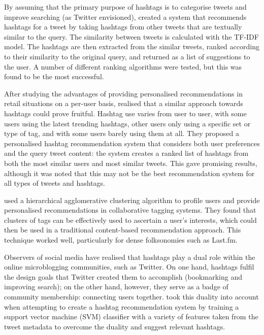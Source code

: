 \documentclass[11pt,a4paper]{report}
\begin{document}
By assuming that the primary purpose of hashtags is to categorise tweets and improve searching (as Twitter envisioned), \textcite{Zangerle:2011} created a system that recommends hashtags for a tweet by taking hashtags from other tweets that are textually similar to the query. The similarity between tweets is calculated with the TF-IDF model. The hashtags are then extracted from the similar tweets, ranked according to their similarity to the original query, and returned as a list of suggestions to the user. A number of different ranking algorithms were tested, but this was found to be the most successful.

After studying the advantages of providing personalised recommendations in retail situations on a per-user basis, \textcite{Kywe:2012} realised that a similar approach towards hashtags could prove fruitful. Hashtag use varies from user to user, with some users using the latest trending hashtags, other users only using a specific set or type of tag, and with some users barely using them at all. They proposed a personalised hashtag recommendation system that considers both user preferences and the query tweet content: the system creates a ranked list of hashtags from both the most similar users and most similar tweets. This gave promising results, although it was noted that this may not be the best recommendation system for all types of tweets and hashtags.

\textcite{Shepitsen:2008} used a hierarchical agglomerative clustering algorithm to profile users and provide personalised recommendations in collaborative tagging systems. They found that clusters of tags can be effectively used to ascertain a user's interests, which could then be used in a traditional content-based recommendation approach. This technique worked well, particularly for dense folksonomies such as Last.fm.

Observers of social media have realised that hashtags play a dual role within the online microblogging communities, such as Twitter. On one hand, hashtags fulfil the design goals that Twitter created them to accomplish (bookmarking and improving search); on the other hand, however, they serve as a badge of community membership: connecting users together. \textcite{Yang:2012} took this duality into account when attempting to create a hashtag recommendation system by training a support vector machine (SVM) classifier with a variety of features taken from the tweet metadata to overcome the duality and suggest relevant hashtags.
\end{document}
